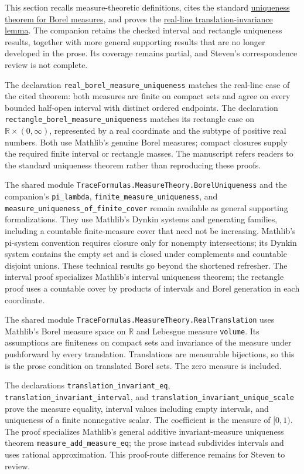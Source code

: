 This section recalls measure-theoretic definitions, cites the standard \hyperref[measure.uniqueness-principle]{uniqueness theorem for Borel measures}, and proves the \hyperref[measure.translation-invariant-line]{real-line translation-invariance lemma}. The companion retains the checked interval and rectangle uniqueness results, together with more general supporting results that are no longer developed in the prose. Its coverage remains partial, and Steven's correspondence review is not complete.

The declaration \texttt{real\_borel\_measure\_uniqueness} matches the real-line case of the cited theorem: both measures are finite on compact sets and agree on every bounded half-open interval with distinct ordered endpoints. The declaration \texttt{rectangle\_borel\_measure\_uniqueness} matches its rectangle case on $\mathbb R\times(0,\infty)$, represented by a real coordinate and the subtype of positive real numbers. Both use Mathlib's genuine Borel measures; compact closures supply the required finite interval or rectangle masses. The manuscript refers readers to the standard uniqueness theorem rather than reproducing these proofs.

The shared module \texttt{TraceFormulas.MeasureTheory.BorelUniqueness} and the companion's \texttt{pi\_lambda}, \texttt{finite\_measure\_uniqueness}, and \texttt{measure\_uniqueness\_of\_finite\_cover} remain available as general supporting formalizations. They use Mathlib's Dynkin systems and generating families, including a countable finite-measure cover that need not be increasing. Mathlib's pi-system convention requires closure only for nonempty intersections; its Dynkin system contains the empty set and is closed under complements and countable disjoint unions. These technical results go beyond the shortened refresher. The interval proof specializes Mathlib's interval uniqueness theorem; the rectangle proof uses a countable cover by products of intervals and Borel generation in each coordinate.

The shared module \texttt{TraceFormulas.MeasureTheory.RealTranslation} uses Mathlib's Borel measure space on $\mathbb R$ and Lebesgue measure \texttt{volume}. Its assumptions are finiteness on compact sets and invariance of the measure under pushforward by every translation. Translations are measurable bijections, so this is the prose condition on translated Borel sets. The zero measure is included.

The declarations \texttt{translation\_invariant\_eq}, \texttt{translation\_invariant\_interval}, and \texttt{translation\_invariant\_unique\_scale} prove the measure equality, interval values including empty intervals, and uniqueness of a finite nonnegative scalar. The coefficient is the measure of $[0,1)$. The proof specializes Mathlib's general additive invariant-measure uniqueness theorem \texttt{measure\_add\_measure\_eq}; the prose instead subdivides intervals and uses rational approximation. This proof-route difference remains for Steven to review.

